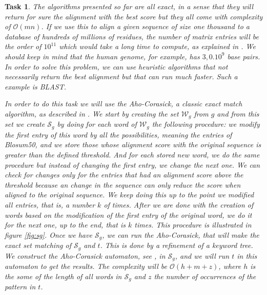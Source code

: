\documentclass[11pt]{article} %
\theoremstyle{problemstyle}
\newtheorem{exercise}{Task}	%
\theoremstyle{problemstyle}
\renewcommand*{\O}{\mathcal{O}}
\renewcommand*{\S}{\mathcal{S}}
\newcommand*{\W}{\mathcal{W}}
\begin{document}
\begin{exercise} %
The algorithms presented so far are all exact, in a sense that they will return for sure the alignment with the best score but they all come with complexity of $\O(mn)$. If we use this to align a given sequence of size one thousand to a database of hundreds of millions of residues, the number of matrix entries will be the order of $10^{11}$ which would take a long time to compute, as explained in \cite{durbin}. We should keep in mind that the human genome, for example, has $3,0.10^9$ base pairs. In order to solve this problem, we can use heuristic algorithms that not necessarily return the best alignment but that can run much faster. Such a example is BLAST.

In order to do this task we will use the Aho-Corasick, a classic exact match algorithm, as described in \cite{pekka}. We start by creating the set $\W_g$ from $g$ and from this set we create $\S_g$ by doing for each word of $\W_g$ the following procedure: we modify the first entry of this word by all the possibilities, meaning the entries of Blosum50, and we store those whose alignment score with the original sequence is greater than the defined threshold. And for each stored new word, we do the same procedure but instead of changing the first entry, we change the next one. We can check for changes only for the entries that had an alignment score above the threshold because an change in the sequence can only reduce the score when aligned to the original sequence. We keep doing this up to the point we modified all entries, that is, a number $k$ of times. After we are done with the creation of words based on the modification of the first entry of the original word, we do it for the next one, up to the end, that is $k$ times. This procedure is illustrated in figure \ref{fig:sg}. Once we have $\S_g$, we can run the Aho-Corasick, that will make the exact set matching of $\S_g$ and $t$. This is done by a refinement of a keyword tree. We construct the Aho-Corasick automaton, see \cite{pekka}, in $\S_g$, and we will run $t$ in this automaton to get the results. The complexity will be $\O(h+m+z)$, where $h$ is the some of the length of all words in $\S_g$ and $z$ the number of occurrences of the pattern in $t$. 

\begin{figure}[h]
\end{figure}
\end{exercise}
\end{document}

